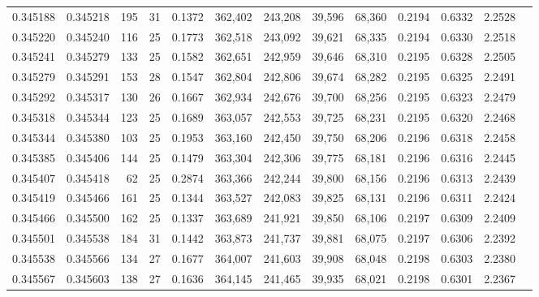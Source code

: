 \begin{tabular}{rrrrrrrrrrrrr}
0.345188 & 0.345218 &   195 &  31 &                                     0.1372 & 362,402 & 243,208 &  39,596 &  68,360 & 0.2194 & 0.6332 & 2.2528 \\
0.345220 & 0.345240 &   116 &  25 &                                     0.1773 & 362,518 & 243,092 &  39,621 &  68,335 & 0.2194 & 0.6330 & 2.2518 \\
0.345241 & 0.345279 &   133 &  25 &                                     0.1582 & 362,651 & 242,959 &  39,646 &  68,310 & 0.2195 & 0.6328 & 2.2505 \\
0.345279 & 0.345291 &   153 &  28 &                                     0.1547 & 362,804 & 242,806 &  39,674 &  68,282 & 0.2195 & 0.6325 & 2.2491 \\
0.345292 & 0.345317 &   130 &  26 &                                     0.1667 & 362,934 & 242,676 &  39,700 &  68,256 & 0.2195 & 0.6323 & 2.2479 \\
0.345318 & 0.345344 &   123 &  25 &                                     0.1689 & 363,057 & 242,553 &  39,725 &  68,231 & 0.2195 & 0.6320 & 2.2468 \\
0.345344 & 0.345380 &   103 &  25 &                                     0.1953 & 363,160 & 242,450 &  39,750 &  68,206 & 0.2196 & 0.6318 & 2.2458 \\
0.345385 & 0.345406 &   144 &  25 &                                     0.1479 & 363,304 & 242,306 &  39,775 &  68,181 & 0.2196 & 0.6316 & 2.2445 \\
0.345407 & 0.345418 &    62 &  25 &                                     0.2874 & 363,366 & 242,244 &  39,800 &  68,156 & 0.2196 & 0.6313 & 2.2439 \\
0.345419 & 0.345466 &   161 &  25 &                                     0.1344 & 363,527 & 242,083 &  39,825 &  68,131 & 0.2196 & 0.6311 & 2.2424 \\
0.345466 & 0.345500 &   162 &  25 &                                     0.1337 & 363,689 & 241,921 &  39,850 &  68,106 & 0.2197 & 0.6309 & 2.2409 \\
0.345501 & 0.345538 &   184 &  31 &                                     0.1442 & 363,873 & 241,737 &  39,881 &  68,075 & 0.2197 & 0.6306 & 2.2392 \\
0.345538 & 0.345566 &   134 &  27 &                                     0.1677 & 364,007 & 241,603 &  39,908 &  68,048 & 0.2198 & 0.6303 & 2.2380 \\
0.345567 & 0.345603 &   138 &  27 &                                     0.1636 & 364,145 & 241,465 &  39,935 &  68,021 & 0.2198 & 0.6301 & 2.2367 \\

\end{tabular}
